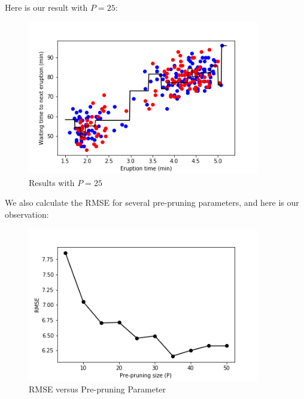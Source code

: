 \documentclass[11pt,reqno]{amsart}
\begin{document}
Here is our result with $P=25$:
\begin{figure}[ht]
	\centering
	\caption{Results with $P=25$}
	\label{kernelfig}
	\begin{centering}
		\includegraphics[width=0.9\textwidth]{dataplot.png}
	\end{centering}
\end{figure}

We also calculate the RMSE for several pre-pruning parameters, and here is our observation:
\begin{figure}[h]
	\centering
	\caption{RMSE versus Pre-pruning Parameter}
	\label{kernelfig}
	\begin{centering}
		\includegraphics[width=0.9\textwidth]{pptorms.png}
	\end{centering}
\end{figure}
\end{document}
